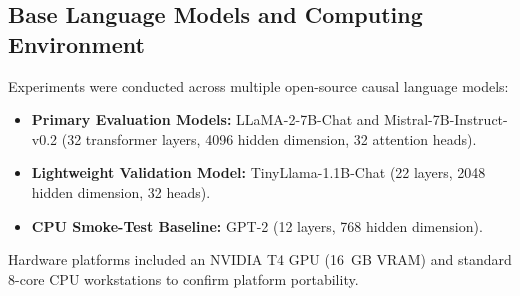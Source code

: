 \documentclass[journal]{IEEEtran}
\begin{document}
\subsection{Base Language Models and Computing Environment}
Experiments were conducted across multiple open-source causal language models:
\begin{itemize}
    \item \textbf{Primary Evaluation Models:} LLaMA-2-7B-Chat \cite{touvron2023llama} and Mistral-7B-Instruct-v0.2 \cite{jiang2023mistral} (32 transformer layers, 4096 hidden dimension, 32 attention heads).
    \item \textbf{Lightweight Validation Model:} TinyLlama-1.1B-Chat \cite{zhang2024tinyllama} (22 layers, 2048 hidden dimension, 32 heads).
    \item \textbf{CPU Smoke-Test Baseline:} GPT-2 (12 layers, 768 hidden dimension).
\end{itemize}
Hardware platforms included an NVIDIA T4 GPU (16~GB VRAM) and standard 8-core CPU workstations to confirm platform portability.
\end{document}

